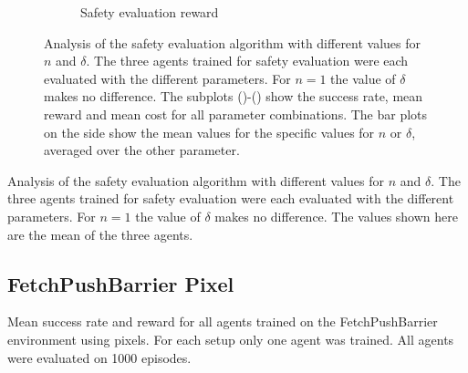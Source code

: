 \begin{figure}
\begin{subfigure}[b]{.6\textwidth}
    \caption{Safety evaluation reward}
    \label{fig:results:barrier-state-safety-eval-cost}
    \end{subfigure}
    \caption[Analysis of the safety evaluation algorithm.]{Analysis of the safety evaluation algorithm with different values for $n$ and $\delta$. The three agents trained for safety evaluation were each evaluated with the different parameters. For $n=1$ the value of $\delta$ makes no difference. The subplots ()-() show the success rate, mean reward and mean cost for all parameter combinations. The bar plots on the side show the mean values for the specific values for $n$ or $\delta$, averaged over the other parameter.}
    \label{fig:results:barrier-state-safety-eval}
\end{figure}

\begin{table}[btp]
    \centering
    
    \caption[Analysis of the safety evaluation algorithm.]{Analysis of the safety evaluation algorithm with different values for $n$ and $\delta$. The three agents trained for safety evaluation were each evaluated with the different parameters. For $n=1$ the value of $\delta$ makes no difference. The values shown here are the mean of the three agents.}
    \label{tab:results:barrier-state-safety-eval}
\end{table}

\subsection{FetchPushBarrier Pixel}
\label{sec:results:fetch-push-barrier-pixel}

\begin{table}[btp]
    \centering
    
    \caption[Mean success rate, reward and cost for all agents trained on the FetchPushBarrier environment using pixels.]{Mean success rate and reward for all agents trained on the FetchPushBarrier environment using pixels. For each setup only one agent was trained. All agents were evaluated on 1000 episodes.}
    \label{tab:results:barrier-drq}
\end{table}

